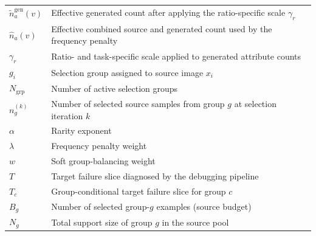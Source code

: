 \begin{table}[t]
\begin{tabular}{ll}
$\tilde{n}_a^{\mathrm{gen}}(v)$ & Effective generated count after applying the ratio-specific scale $\gamma_r$ \\
$\hat{n}_a(v)$ & Effective combined source and generated count used by the frequency penalty \\
$\gamma_r$ & Ratio- and task-specific scale applied to generated attribute counts \\
$g_i$ & Selection group assigned to source image $x_i$ \\
$N_{\mathrm{grp}}$ & Number of active selection groups \\
$n_g^{(k)}$ & Number of selected source samples from group $g$ at selection iteration $k$ \\
$\alpha$ & Rarity exponent \\
$\lambda$ & Frequency penalty weight \\
$w$ & Soft group-balancing weight \\
$T$ & Target failure slice diagnosed by the debugging pipeline \\
$T_c$ & Group-conditional target failure slice for group $c$ \\
$B_g$ & Number of selected group-$g$ examples (source budget) \\
$N_g$ & Total support size of group $g$ in the source pool \\
\bottomrule
\end{tabular}
\end{table}
